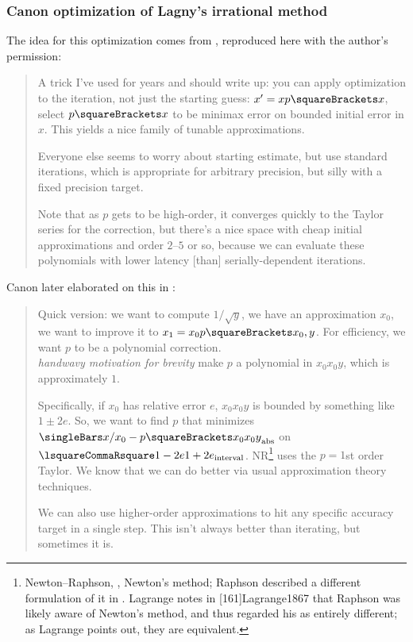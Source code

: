 ﻿\documentclass[10pt, a4paper, twoside]{basestyle}
\begin{document}
\subsubsection*{Canon optimization of Lagny's irrational method}
The idea for this optimization comes from \cite{Canon2018a}, reproduced here with the author’s permission:
\begin{quotation}
 A trick I’ve used for years and should write up: you can apply optimization to the iteration,
 not just the starting guess: $x' = x p\of x$, select $p\of x$ to be minimax error on bounded
 initial error in $x$. This yields a nice family of tunable approximations.

 Everyone else seems to worry about starting estimate, but use standard iterations,
 which is appropriate for arbitrary precision, but silly with a fixed precision target.

 Note that as $p$ gets to be high-order, it converges quickly to the Taylor series for the
 correction, but there's a nice space with cheap initial approximations and order $2$--$5$ or
 so, because we can evaluate these polynomials with lower latency [than] serially-dependent
 iterations.
\end{quotation}
Canon later elaborated on this in \cite{Canon2018b}:
\begin{quotation}
 Quick version: we want to compute $1/\sqrt{y}$, we have an approximation $x_0$, we want to
 improve it to $x_1 = x_0 p\of{x_0, y}$. For efficiency, we want $p$ to be a polynomial correction.\\
 \textit{handwavy motivation for brevity} make $p$ a polynomial in $x_0x_0y$, which is approximately $1$.

 Specifically, if $x_0$ has relative error $e$, $x_0x_0y$ is bounded by something like $1 \pm 2e$.
 So, we want to find $p$ that minimizes $\abs{x/x_0 - p\of{x_0x_0y}}$ on $\intclos{1-2e}{1+2e}$.
 NR\footnote{Newton--Raphson, \idest, Newton's method; Raphson described a different formulation of it in \cite{Raphson1690}.
Lagrange notes in [161]{Lagrange1867} that Raphson was likely aware of Newton's method, and thus
regarded his as entirely different; as Lagrange points out, they are equivalent.}
uses the $p = 1$st order Taylor. We know that we can do better via usual approximation theory techniques.

 We can also use higher-order approximations to hit any specific accuracy target in a single step.
 This isn't always better than iterating, but sometimes it is.
\end{quotation}
\end{document}
